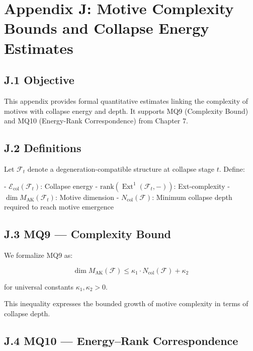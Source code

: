 \documentclass[11pt]{article}
\DeclareMathOperator{\Ext}{Ext}
\begin{document}
\FloatBarrier




\section*{Appendix J: Motive Complexity Bounds and Collapse Energy Estimates}

\subsection*{J.1 Objective}

This appendix provides formal quantitative estimates linking the complexity of motives with collapse energy and depth. It supports MQ9 (Complexity Bound) and MQ10 (Energy-Rank Correspondence) from Chapter 7.

\subsection*{J.2 Definitions}

Let $\mathcal{F}_t$ denote a degeneration-compatible structure at collapse stage $t$. Define:

- $\mathcal{E}_{\mathrm{col}}(\mathcal{F}_t)$: Collapse energy
- $\mathrm{rank}(\Ext^1(\mathcal{F}_t, -))$: Ext-complexity
- $\dim M_{\mathrm{AK}}(\mathcal{F}_t)$: Motive dimension
- $N_{\mathrm{col}}(\mathcal{F})$: Minimum collapse depth required to reach motive emergence

\subsection*{J.3 MQ9 — Complexity Bound}

We formalize MQ9 as:

\[
\dim M_{\mathrm{AK}}(\mathcal{F}) \leq \kappa_1 \cdot N_{\mathrm{col}}(\mathcal{F}) + \kappa_2
\]

for universal constants $\kappa_1, \kappa_2 > 0$.

This inequality expresses the bounded growth of motive complexity in terms of collapse depth.

\subsection*{J.4 MQ10 — Energy–Rank Correspondence}
\end{document}
